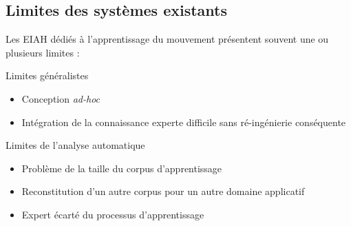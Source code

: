     \subsection{Limites des systèmes existants}
    \begin{frame}{\subsecname}
        Les EIAH dédiés à l'apprentissage du mouvement présentent souvent une ou plusieurs limites :
        \begin{block}{Limites généralistes}
            \begin{itemize}[label=$\bullet$]
                \item Conception \textit{ad-hoc}
                \item Intégration de la connaissance experte difficile sans ré-ingénierie conséquente
            \end{itemize}
        \end{block}
        
        \begin{block}{Limites de l'analyse automatique}
            \begin{itemize}[label=$\bullet$]
                \item Problème de la taille du corpus d'apprentissage
                \item Reconstitution d'un autre corpus pour un autre domaine applicatif
                \item Expert écarté du processus d'apprentissage
            \end{itemize}
        \end{block}
    \end{frame}
    
